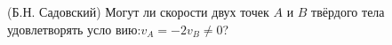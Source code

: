 (Б.Н. Садовский)
Могут ли скорости двух точек $A$ и $B$ твёрдого тела удовлетворять усло
вию:$v_A=-2v_B\neq0$?
